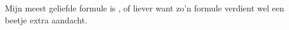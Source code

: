\documentclass[11pt,a4paper]{amsart}
\begin{document}
Mijn meest geliefde formule is , of liever
want zo'n formule verdient wel een beetje extra aandacht.
\end{document}
